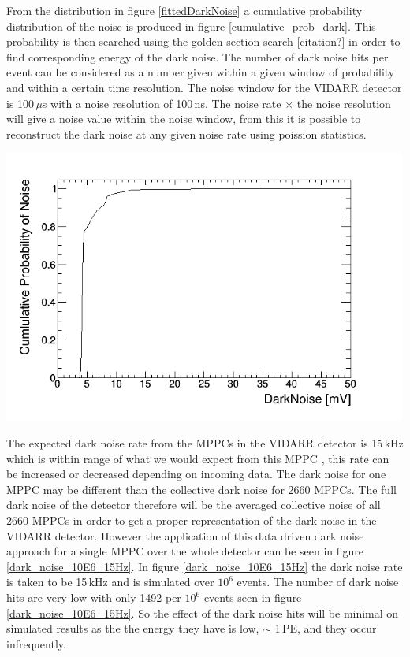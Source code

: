 \documentclass[12pt,a4paper]{article}
\newenvironment{Figure}
  {\par\medskip\noindent\minipage{\linewidth}}
  {\endminipage\par\medskip}
\begin{document}
From the distribution in figure \ref{fittedDarkNoise} a cumulative probability distribution of the noise is produced in figure \ref{cumulative_prob_dark}. This probability is then searched using the golden section search [citation?] in order to find corresponding energy of the dark noise. The number of dark noise hits per event can be considered as a number given within a given window of probability and within a certain time resolution. The noise window for the VIDARR detector is 100\,$\mu$s with a noise resolution of 100\,ns. The noise rate $\times$ the noise resolution will give a noise value within the noise window, from this it is possible to reconstruct the dark noise at any given noise rate using poission statistics. 
 
\begin{Figure}
 \centering
 \includegraphics[height=90mm]{cumulative_prob_dark_noise.png}
 \label{cumulative_prob_dark}
\end{Figure}

The expected dark noise rate from the MPPCs in the VIDARR detector is 15\,kHz which is within range of what we would expect from this MPPC \cite{hamamatsu_mppc_spec}, this rate can be increased or decreased depending on incoming data. The dark noise for one MPPC may be different than the collective dark noise for 2660 MPPCs. The full dark noise of the detector therefore will be the averaged collective noise of all 2660 MPPCs in order to get a proper representation of the dark noise in the VIDARR detector. However the application of this data driven dark noise approach for a single MPPC over the whole detector can be seen in figure \ref{dark_noise_10E6_15Hz}. In figure \ref{dark_noise_10E6_15Hz} the dark noise rate is taken to be 15\,kHz and is simulated over $10^6$ events.  The number of dark noise hits are very low with only 1492 per $10^6$ events seen in figure \ref{dark_noise_10E6_15Hz}. So the effect of the dark noise hits will be minimal on simulated results as the the energy they have is low, $\sim$ 1\,PE, and they occur infrequently.
\end{document}
